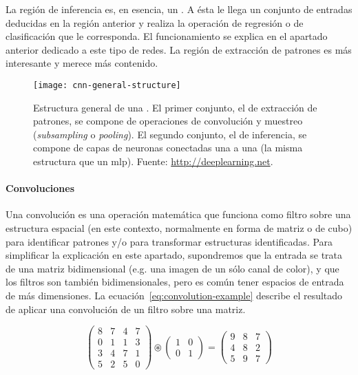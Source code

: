 La región de inferencia es, en esencia, un . A ésta le llega un conjunto de entradas deducidas en la región anterior y realiza la operación de regresión o de clasificación que le corresponda. El funcionamiento se explica en el apartado anterior dedicado a este tipo de redes. La región de extracción de patrones es más interesante y merece más contenido.

\begin{figure}[t]
	\texttt{[image: cnn-general-structure]}
	\caption[Estructura general de una ]{Estructura general de una . El primer conjunto, el de extracción de patrones, se compone de operaciones de convolución y muestreo (\textit{subsampling} o \textit{pooling}). El segundo conjunto, el de inferencia, se compone de capas de neuronas conectadas una a una (la misma estructura que un \acrshort{mlp}). Fuente: \url{http://deeplearning.net}.}
	\label{fig:cnn-general-structure}
\end{figure}

\paragraph{Convoluciones}

Una convolución es una operación matemática que funciona como filtro sobre una estructura espacial (en este contexto, normalmente en forma de matriz o de cubo) para identificar patrones y/o para transformar estructuras identificadas. Para simplificar la explicación en este apartado, supondremos que la entrada se trata de una matriz bidimensional (e.g. una imagen de un sólo canal de color), y que los filtros son también bidimensionales, pero es común tener espacios de entrada de más dimensiones. La ecuación~\ref{eq:convolution-example} describe el resultado de aplicar una convolución de un filtro sobre una matriz.

\begin{equation*}
	\begin{pmatrix}
		8 & 7 & 4 & 7  \\
		0 & 1 & 1 & 3  \\
		3 & 4 & 7 & 1  \\
		5 & 2 & 5 & 0
	\end{pmatrix}
	\circledast
	\begin{pmatrix}
		1 & 0 \\
		0 & 1
	\end{pmatrix}
	=
	\begin{pmatrix}
		9 & 8 & 7  \\
		4 & 8 & 2  \\
		5 & 9 & 7
	\end{pmatrix}
	\label{eq:convolution-example}
\end{equation*}

